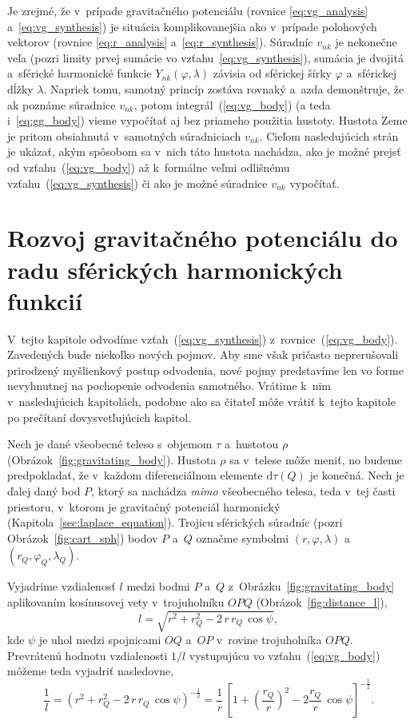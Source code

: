 \documentclass[a4paper, 12pt]{book}
\newcommand{\diff}{\mathrm d}
\begin{document}
Je zrejmé, že v~prípade gravitačného potenciálu (rovnice \ref{eq:vg_analysis}
a~\ref{eq:vg_synthesis}) je situácia komplikovanejšia ako v~prípade polohových
vektorov (rovnice \ref{eq:r_analysis} a~\ref{eq:r_synthesis}).  Súradníc
$v_{nk}$ je nekonečne veľa (pozri limity prvej sumácie vo
vzťahu~\ref{eq:vg_synthesis}), sumácia je dvojitá a~sférické harmonické funkcie
$Y_{nk}(\varphi, \lambda)$ závisia od sférickej šírky $\varphi$ a~sférickej
dĺžky $\lambda$.  Napriek tomu, samotný princíp zostáva rovnaký a~azda
demonštruje, že ak poznáme súradnice $v_{nk}$, potom
integrál~(\ref{eq:vg_body}) (a teda i~\ref{eq:gg_body}) vieme vypočítať aj bez
priameho použitia hustoty.  Hustota Zeme je pritom obsiahnutá v~samotných
súradniciach $v_{nk}$.  Cieľom nasledujúcich strán je ukázať, akým spôsobom sa
v~nich táto hustota nachádza, ako je možné prejsť od vzťahu~(\ref{eq:vg_body})
až k~formálne veľmi odlišnému vzťahu~(\ref{eq:vg_synthesis}) či ako je možné
súradnice $v_{nk}$ vypočítať.



\section{Rozvoj gravitačného potenciálu do radu sférických harmonických
funkcií}
\label{sec:vg_sh_expansion}

V~tejto kapitole odvodíme vzťah~(\ref{eq:vg_synthesis})
z~rovnice~(\ref{eq:vg_body}).  Zavedených bude niekoľko nových pojmov.  Aby sme
však pričasto neprerušovali prirodzený myšlienkový postup odvodenia, nové pojmy
predstavíme len vo forme nevyhnutnej na pochopenie odvodenia samotného.
Vrátime k~nim v~nasledujúcich kapitolách, podobne ako sa čitateľ môže vrátiť
k~tejto kapitole po prečítaní dovysvetľujúcich kapitol.

Nech je dané všeobecné teleso s~objemom $\tau$ a~hustotou $\rho$
(Obrázok~\ref{fig:gravitating_body}).  Hustota $\rho$ sa v~telese môže meniť,
no budeme predpokladať, že v~každom diferenciálnom elemente $\diff \tau(Q)$ je
konečná.  Nech je ďalej daný bod $P$, ktorý sa nachádza \emph{mimo} všeobecného
telesa, teda v~tej časti priestoru, v~ktorom je gravitačný potenciál harmonický
(Kapitola~\ref{sec:laplace_equation}).  Trojicu sférických súradníc (pozri
Obrázok~\ref{fig:cart_sph}) bodov $P$ a~$Q$ označme symbolmi $(r, \varphi,
\lambda)$ a~$(r_Q, \varphi_Q, \lambda_Q)$.

Vyjadrime vzdialenosť $l$ medzi bodmi $P$ a~$Q$
z~Obrázku~\ref{fig:gravitating_body} aplikovaním kosínusovej vety
v~trojuholníku $OPQ$ (Obrázok~\ref{fig:distance_l}),
%
\begin{equation}
l = \sqrt{r^2 + r_Q^2 - 2 \, r \, r_Q \, \cos\psi}{,}
\end{equation}
%
kde $\psi$ je uhol medzi spojnicami $OQ$ a~$OP$ v~rovine trojuholníka $OPQ$.
Prevrátenú hodnotu vzdialenosti $1 \slash l$ vystupujúcu vo
vzťahu~(\ref{eq:vg_body}) môžeme teda vyjadriť nasledovne,
%
\begin{equation}
\label{eq:1l}
\frac{1}{l} = \left( r^2 + r_Q^2 - 2 \, r \, r_Q \, \cos\psi
\right)^{-\frac{1}{2}} = \frac{1}{r} \, \left[1 + \left( \dfrac{r_Q}{r}
\right)^2 - 2 \dfrac{r_Q}{r} \, \cos\psi \right]^{-\frac{1}{2}}{.}
\end{equation}
\end{document}
